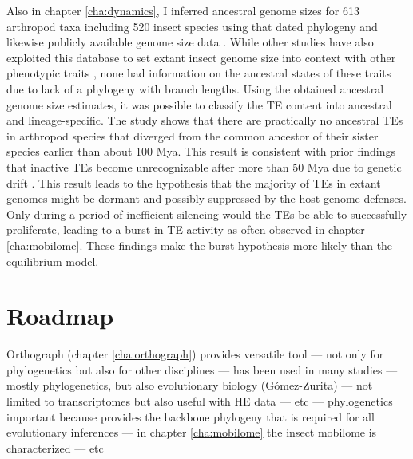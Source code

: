 Also in chapter \ref{cha:dynamics}, I inferred ancestral genome sizes
for 613 arthropod taxa including 520 insect species using that dated
phylogeny and likewise publicly available genome size data
\citep{Gregory2018}. While other studies have also exploited this
database to set extant insect genome size into context with other
phenotypic traits \citep{Alfsnes2017, Gregory2011}, none had information
on the ancestral states of these traits due to lack of a phylogeny with
branch lengths. Using the obtained ancestral genome size estimates, it
was possible to classify the TE content into ancestral and
lineage-specific. The study shows that there are practically no
ancestral TEs in arthropod species that diverged from the common
ancestor of their sister species earlier than about 100 Mya. This result
is consistent with prior findings that inactive TEs become
unrecognizable after more than 50 Mya due to genetic drift
\citep{Shedlock2000}. This result leads to the hypothesis that the
majority of TEs in extant genomes might be dormant and possibly
suppressed by the host genome defenses. Only during a period of
inefficient silencing would the TEs be able to successfully proliferate,
leading to a burst in TE activity as often observed in chapter
\ref{cha:mobilome}. These findings make the burst hypothesis more likely
than the equilibrium model.

\section{Roadmap}

Orthograph (chapter \ref{cha:orthograph}) provides versatile tool ---
not only for phylogenetics but also for other disciplines --- has been
used in many studies --- mostly phylogenetics, but also evolutionary
biology (Gómez-Zurita) --- not limited to transcriptomes but also useful
with HE data --- etc --- phylogenetics important because provides the
backbone phylogeny that is required for all evolutionary inferences ---
in chapter \ref{cha:mobilome} the insect mobilome is characterized ---
etc
